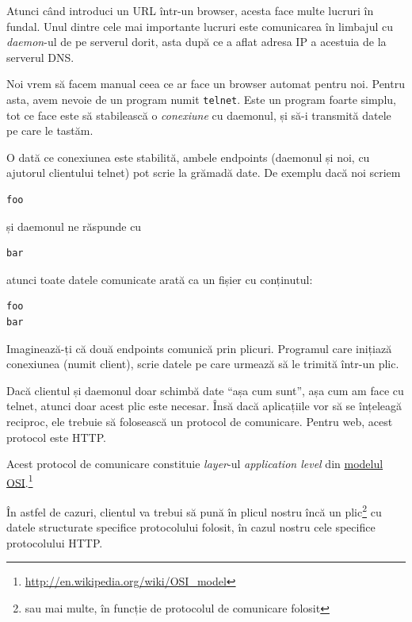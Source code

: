 \vspace{1em}\dotfill\vspace{1em}

Atunci când introduci un URL într-un browser, acesta face multe lucruri în fundal.
Unul dintre cele mai importante lucruri este comunicarea în limbajul
 cu \textit{daemon}-ul de pe serverul dorit,
asta după ce a aflat adresa IP a acestuia de la serverul DNS.

Noi vrem să facem manual ceea ce ar face un browser automat pentru noi. Pentru asta,
avem nevoie de un program numit \texttt{telnet}. Este un program foarte simplu, tot ce
face este să stabilească o \textsl{conexiune} cu daemonul, și să-i transmită datele pe care
le tastăm.

O dată ce conexiunea este stabilită, ambele endpoints (daemonul și noi, cu ajutorul
clientului telnet) pot scrie la grămadă date. De exemplu dacă noi scriem
\begin{verbatim}
foo
\end{verbatim}
și daemonul ne răspunde cu
\begin{verbatim}
bar
\end{verbatim}
atunci toate datele comunicate arată ca un fișier cu conținutul:
\begin{verbatim}
foo
bar
\end{verbatim}

Imaginează-ți că două endpoints comunică prin plicuri.
Programul care inițiază conexiunea (numit client), scrie datele pe
care urmează să le trimită într-un plic.

Dacă clientul și daemonul doar schimbă date ``așa cum sunt'',
așa cum am face cu telnet, atunci doar acest plic este necesar.
Însă dacă aplicațiile vor să se înțeleagă reciproc,
ele trebuie să folosească un protocol de comunicare.
Pentru web, acest protocol este HTTP.

Acest protocol de comunicare constituie \textit{layer}-ul \textsl{application level}
din \href{http://en.wikipedia.org/wiki/OSI_model}{modelul OSI}.\footnote{\url{http://en.wikipedia.org/wiki/OSI_model}}

În astfel de cazuri, clientul va trebui să pună în plicul nostru încă
un plic\footnote{sau mai multe, în funcție de protocolul de comunicare folosit}
cu datele structurate specifice protocolului folosit,
în cazul nostru cele specifice protocolului HTTP.

